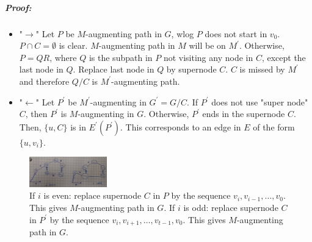\documentclass[main]{subfiles}
\begin{document}
\subparagraph{Proof:}
\begin{itemize}
\item "$\rightarrow$"
\subitem Let $P$ be $M$-augmenting path in $G$, wlog $P$ does not start in
$v_0$. $P \cap C = \emptyset$ is clear. $M$-augmenting path in $M$ will be on
$M^\prime$. Otherwise, $P = QR$, where $Q$ is the subpath in $P$ not visiting
any node in $C$, except the last node in $Q$. Replace last node in $Q$ by
supernode $C$. $C$ is missed by $M^\prime$ and therefore $Q/C$ is
$M^\prime$-augmenting path.
\item "$\leftarrow$"
\subitem Let $P^\prime$ be $M^\prime$-augmenting in $G^\prime = G/C$. If
$P^\prime$ does not use "super node" $C$, then $P^\prime$ is $M$-augmenting in
$G$. Otherwise, $P^\prime$ ends in the supernode $C$. Then, $\{u,C\}$ is in
$E^\prime(P^\prime)$. This corresponds to an edge in $E$ of the form
$\{u,v_i\}$.
\end{itemize}

\begin{figure}[!h]
  \centering
    \includegraphics[width=0.3\textwidth]{imgs/supernode.jpg}
	\caption{If $i$ is even: replace supernode $C$ in $P$ by the sequence $v_i,
	v_{i-1}, \dots, v_0$. This gives $M$-augmenting path in $G$. If $i$ is odd:
	replace supernode $C$ in $P^\prime$ by the sequence $v_i, v_{i+1}, \dots,
	v_{t-1}, v_0$. This gives $M$-augmenting path in $G$.}
\end{figure}
\end{document}
